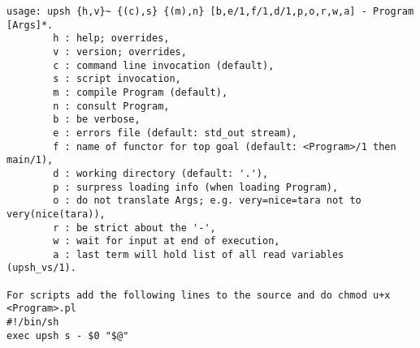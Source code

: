 \begin{verbatim}
usage: upsh {h,v}~ {(c),s} {(m),n} [b,e/1,f/1,d/1,p,o,r,w,a] - Program [Args]*.
        h : help; overrides,
        v : version; overrides,
        c : command line invocation (default),
        s : script invocation,
        m : compile Program (default),
        n : consult Program,
        b : be verbose,
        e : errors file (default: std_out stream),
        f : name of functor for top goal (default: <Program>/1 then main/1),
        d : working directory (default: '.'),
        p : surpress loading info (when loading Program),
        o : do not translate Args; e.g. very=nice=tara not to very(nice(tara)),
        r : be strict about the '-',
        w : wait for input at end of execution,
        a : last term will hold list of all read variables (upsh_vs/1).

For scripts add the following lines to the source and do chmod u+x <Program>.pl
#!/bin/sh
exec upsh s - $0 "$@"
\end{verbatim}
